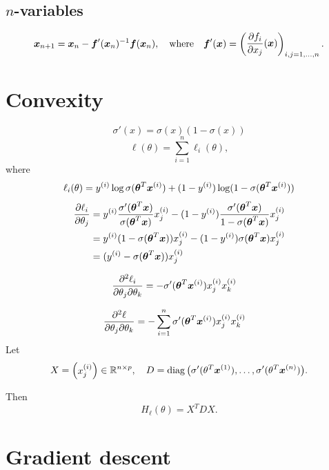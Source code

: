 \documentclass[12pt]{amsart}
\begin{document}
\subsection{$n$-variables}
\[
    \boldsymbol{x}_{n+1} = \boldsymbol{x}_n - \boldsymbol{f}'(\boldsymbol{x}_n)^{-1}\boldsymbol{f}(\boldsymbol{x}_n),
    \quad\text{where}\quad 
    \boldsymbol{f}'(\boldsymbol{x}) = 
    \begin{pmatrix}
        \dfrac{\partial f_i}{\partial x_j}(\boldsymbol{x})
    \end{pmatrix}_{i,j=1,\ldots,n}.
\]

\section{Convexity}
\begin{equation}\label{E:sigmoid_DE}
    \sigma'(x) = \sigma(x)(1-\sigma(x))
\end{equation}
\[
    \ell(\theta) = \sum_{i=1}^n\ell_i(\theta),
\]
where
\[
    \ell_i(\theta) = y^{(i)}\log\sigma(\boldsymbol{\theta}^T\boldsymbol{x}^{(i)})
    + (1-y^{(i)})\log(1-\sigma(\boldsymbol{\theta}^T\boldsymbol{x}^{(i)}))
\]
\begin{align*}
    \frac{\partial \ell_i}{\partial \theta_j}
    &= y^{(i)}\frac{\sigma'(\boldsymbol{\theta}^T\boldsymbol{x})}{\sigma(\boldsymbol{\theta}^T\boldsymbol{x})}x^{(i)}_j
    - (1-y^{(i)})\frac{\sigma'(\boldsymbol{\theta}^T\boldsymbol{x})}{1-\sigma(\boldsymbol{\theta}^T\boldsymbol{x})}x^{(i)}_j\\
    &= y^{(i)}(1-\sigma(\boldsymbol{\theta}^T\boldsymbol{x}))x^{(i)}_j
    - (1-y^{(i)})\sigma(\boldsymbol{\theta}^T\boldsymbol{x})x^{(i)}_j\\
    &= (y^{(i)} - \sigma(\boldsymbol{\theta}^T\boldsymbol{x}))x^{(i)}_j
\end{align*}

\begin{align*}
    \frac{\partial^2 \ell_i}{\partial \theta_j\partial\theta_k}
    &= -\sigma'(\boldsymbol{\theta}^T\boldsymbol{x}^{(i)})x^{(i)}_jx^{(i)}_k
\end{align*}

\begin{align*}
    \frac{\partial^2 \ell}{\partial \theta_j\partial\theta_k}
    &= -\sum_{i=1}^n\sigma'(\boldsymbol{\theta}^T\boldsymbol{x}^{(i)})x^{(i)}_jx^{(i)}_k
\end{align*}
Let
\[
X = \begin{pmatrix}
    x_j^{(i)}
\end{pmatrix}\in\mathbb{R}^{n\times p},\quad    
D = \operatorname{diag}\big(\sigma'(\theta^T\boldsymbol{x}^{(1)}),\ldots,\sigma'(\theta^T\boldsymbol{x}^{(n)})\big).
\]

Then
\[
H_\ell(\theta) = X^TDX.
\]

\section{Gradient descent}
\end{document}

